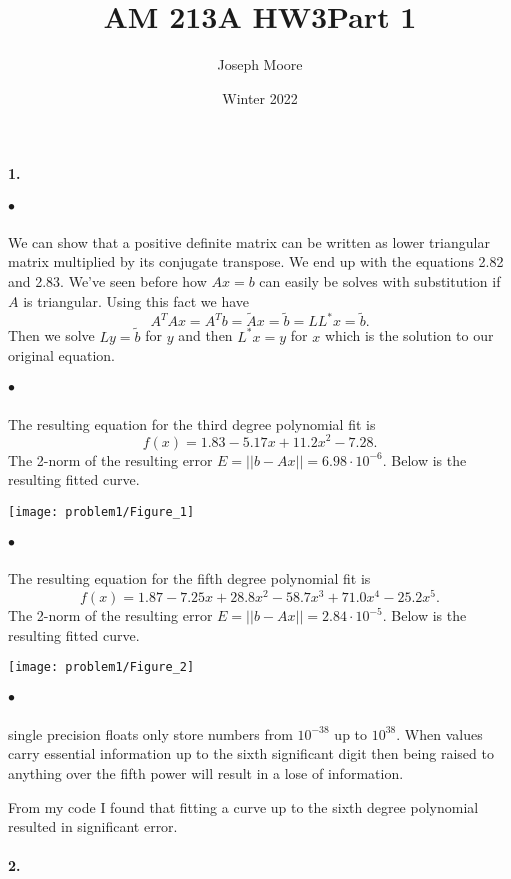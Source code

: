 \documentclass[12pt]{article}
\title{AM 213A HW3}
\author{Joseph Moore}
\date{Winter 2022}
\begin{document}
\maketitle

\title{\textbf{Part 1}}


\paragraph{1.}
	\subparagraph{$\bullet$}
		We can show that a positive definite matrix can be written as lower triangular matrix multiplied by its conjugate transpose. We end up with the equations 2.82 and 2.83. We've seen before how $Ax = b$ can easily be solves with substitution if $A$ is triangular. Using this fact we have
    	\[
    	A^TAx = A^Tb = \tilde{A}x = \tilde{b} = LL^*x = \tilde{b}.
    	\] 
    	Then we solve $Ly = \tilde{b}$ for $y$ and then $L^*x = y$ for $x$ which is the solution to our original equation.
    
    \subparagraph{$\bullet$}
    	The resulting equation for the third degree polynomial fit is 
    	\[
    	f(x) = 1.83 - 5.17x + 11.2x^2 - 7.28.
    	\]
    	The 2-norm of the resulting error $E = ||b - Ax|| = 6.98\cdot10^{-6}$. Below is the resulting fitted curve.
    	
    	\texttt{[image: problem1/Figure\_1]}
    	
    \subparagraph{$\bullet$}
    	The resulting equation for the fifth degree polynomial fit is 
    	\[
    	f(x) = 1.87 - 7.25x + 28.8x^2 - 58.7x^3 + 71.0x^4 - 25.2x^5.
    	\]
    	The 2-norm of the resulting error $E = ||b - Ax|| = 2.84\cdot10^{-5}$. Below is the resulting fitted curve.
    	
    	\texttt{[image: problem1/Figure\_2]}
    	
    \subparagraph{$\bullet$}
    	single precision floats only store numbers from $10^{-38}$ up to $10^{38}$. When values carry essential information up to the sixth significant digit then being raised to anything over the fifth power will result in a lose of information. 
    	
    	From my code I found that fitting a curve up to the sixth degree polynomial resulted in significant error. 
    	
    
\paragraph{2.}
		
	
\end{document}
